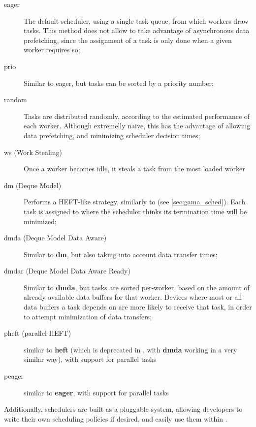\documentclass[main.tex]{subfiles}
\begin{document}
\begin{description}

\item[eager] The default scheduler, using a single task queue, from which workers draw tasks. This method does not allow to take advantage of asynchronous data prefetching, since the assignment of a task is only done when a given worker requires so;

\item[prio] Similar to eager, but tasks can be sorted by a priority number;

\item[random] Tasks are distributed randomly, according to the estimated performance of each worker. Although extremelly naive, this has the advantage of allowing data prefetching, and minimizing scheduler decision times;

\item[ws (Work Stealing)] Once a worker becomes idle, it steals a task from the most loaded worker

\item[dm (Deque Model)] Performs a HEFT-like strategy, similarly to \gama (see \cref{sec:gama_sched}). Each task is assigned to where the scheduler thinks its termination time will be minimized;

\item[dmda (Deque Model Data Aware)] Similar to \textbf{dm}, but also taking into account data transfer times;

\item[dmdar (Deque Model Data Aware Ready)] Similar to \textbf{dmda}, but tasks are sorted per-worker, based on the amount of already available data buffers for that worker. Devices where most or all data buffers a task depends on are more likely to receive that task, in order to attempt minimization of data transfers;

\item[pheft (parallel HEFT)] similar to \textbf{heft} (which is deprecated in \starpu, with \textbf{dmda} working in a very similar way), with support for parallel tasks

\item[peager] similar to \textbf{eager}, with support for parallel tasks

\end{description}

Additionally, schedulers are built as a pluggable system, allowing developers to write their own scheduling policies if desired, and easily use them within \starpu.
\end{document}
